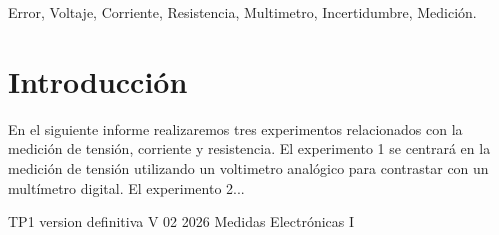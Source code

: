 \documentclass{plantilla}
\begin{document}
\maketitle

\begin{abstract}
En este informe se abordará el desarrollo y análisis del Trabajo Práctico de laboratorio Nro 1. En dicho TP buscaremos medir errores e inccertidumbres en mediciones de tensión, corriente y resistencia. 
\end{abstract}

\begin{IEEEkeywords}
Error, Voltaje, Corriente, Resistencia, Multimetro, Incertidumbre, Medición.
\end{IEEEkeywords}

\section{Introducción}
 En el siguiente informe realizaremos tres experimentos relacionados con la medición de tensión, corriente y resistencia. El experimento 1 se centrará en la medición de tensión utilizando un voltimetro analógico para contrastar con un multímetro digital. El experimento 2...





\begin{thebibliography}{1}
TP1 version definitiva V 02 2026 Medidas Electrónicas I
\end{thebibliography}
\end{document}
